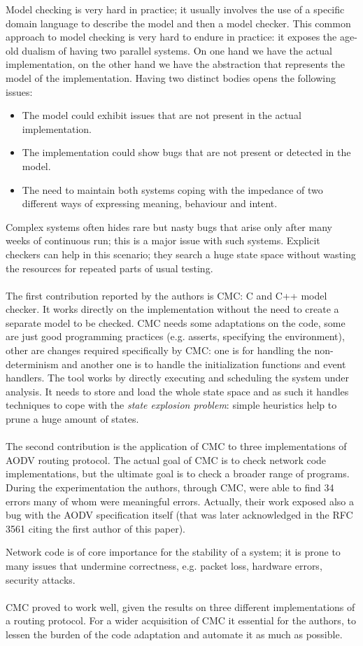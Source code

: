 Model checking is very hard in practice; it usually involves the use of a specific domain language to describe the model and then a model checker. This common approach to model checking is very hard to endure in practice: it exposes the age-old dualism of having two parallel systems.
On one hand we have the actual implementation, on the other hand we have the abstraction that represents the model of the implementation.
Having two distinct bodies opens the following issues:
\begin{itemize}
    \item The model could exhibit issues that are not present in the actual implementation.
    \item The implementation could show bugs that are not present or detected in the model.
    \item The need to maintain both systems coping with the impedance of two different ways of expressing meaning, behaviour and intent.
\end{itemize}


Complex systems often hides rare but nasty bugs that arise only after many weeks of continuous run; this is a major issue with such systems.
Explicit checkers can help in this scenario; they search a huge state space without wasting the resources for repeated parts of usual testing.
\\
\\
The first contribution reported by the authors is CMC: C and C++ model checker.
It works directly on the implementation without the need to create a separate model to be checked. CMC needs some adaptations on the code, some are just good programming practices (e.g. asserts, specifying the environment), other are changes required specifically by CMC: one is for handling the non-determinism and another one is to handle the initialization functions and event handlers.
The tool works by directly executing and scheduling the system under analysis. It needs to store and load the whole state space and as such it handles techniques to cope with the \textit{state explosion problem}: simple heuristics help to prune a huge amount of states.
\\
\\
The second contribution is the application of CMC to three implementations of AODV routing protocol. The actual goal of CMC is to check network code implementations, but the ultimate goal is to check a broader range of programs.
During the experimentation the authors, through CMC, were able to find 34 errors many of whom were meaningful errors. Actually, their work exposed also a bug with the AODV specification itself (that was later acknowledged in the RFC 3561 citing the first author of this paper).

Network code is of core importance for the stability of a system; it is prone to many issues that undermine correctness, e.g. packet loss, hardware errors, security attacks. 
\\
\\
CMC proved to work well, given the results on three different implementations of a routing protocol.
For a wider acquisition of CMC it essential for the authors, to lessen the burden of the code adaptation and automate it as much as possible.


